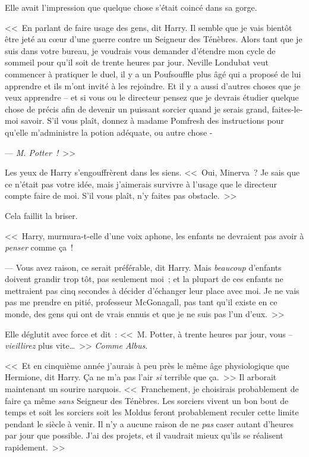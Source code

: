 Elle avait l'impression que quelque chose s'était coincé dans sa gorge.

<<~En parlant de faire usage des gens, dit Harry. Il semble que je vais bientôt être jeté au cœur d'une guerre contre un Seigneur des Ténèbres. Alors tant que je suis dans votre bureau, je voudrais vous demander d'étendre mon cycle de sommeil pour qu'il soit de trente heures par jour. Neville Londubat veut commencer à pratiquer le duel, il y a un Poufsouffle plus âgé qui a proposé de lui apprendre et ils m'ont invité à les rejoindre. Et il y a aussi d'autres choses que je veux apprendre -- et si vous ou le directeur pensez que je devrais étudier quelque chose de précis afin de devenir un puissant sorcier quand je serais grand, faites-le-moi savoir. S'il vous plaît, donnez à madame Pomfresh des instructions pour qu'elle m'administre la potion adéquate, ou autre chose -

--- \emph{M. Potter~!}~>>

Les yeux de Harry s'engouffrèrent dans les siens. <<~Oui, Minerva~? Je sais que ce n'était pas votre idée, mais j'aimerais survivre à l'usage que le directeur compte faire de moi. S'il vous plaît, n'y faites pas obstacle.~>>

Cela faillit la briser.

<<~Harry, murmura-t-elle d'une voix aphone, les enfants ne devraient pas avoir à \emph{penser} comme ça~!

--- Vous avez raison, ce serait préférable, dit Harry. Mais \emph{beaucoup} d'enfants doivent grandir trop tôt, pas seulement moi~; et la plupart de ces enfants ne mettraient pas cinq secondes à décider d'échanger leur place avec moi. Je ne vais pas me prendre en pitié, professeur McGonagall, pas tant qu'il existe en ce monde, des gens qui ont de vrais ennuis et que je ne suis pas l'un d'eux.~>>

Elle déglutit avec force et dit~: <<~M. Potter, à trente heures par jour, vous -- \emph{vieillirez} plus vite…~>> \emph{Comme Albus}.

<<~Et en cinquième année j'aurais à peu près le même âge physiologique que Hermione, dit Harry. Ça ne m'a pas l'air \emph{si} terrible que ça.~>> Il arborait maintenant un sourire narquois. <<~Franchement, je choisirais probablement de faire ça même \emph{sans} Seigneur des Ténèbres. Les sorciers vivent un bon bout de temps et soit les sorciers soit les Moldus feront probablement reculer cette limite pendant le siècle à venir. Il n'y a aucune raison de ne \emph{pas} caser autant d'heures par jour que possible. J'ai des projets, et il vaudrait mieux qu'ils se réalisent rapidement.~>>

